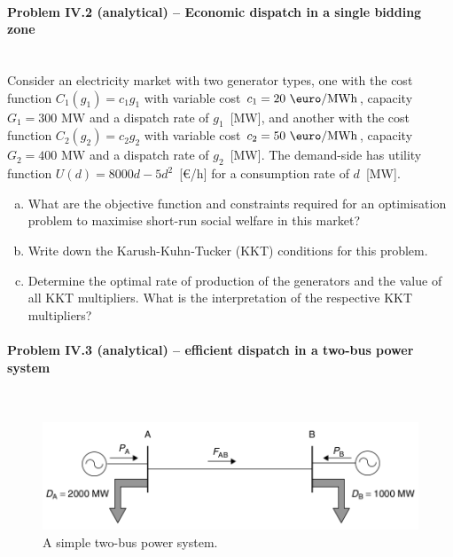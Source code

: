 \documentclass[11pt,a4paper,fleqn]{scrartcl}
\def\mw{\text{ MW}}
\def\emwh{\text{ \euro/MWh}}
\begin{document}
\paragraph{Problem IV.2 (analytical) -- Economic dispatch in a single bidding zone \faGroup}~\\

Consider an electricity market with two generator types, one with the cost function $C_1(g_1)=c_1g_1$ with variable cost $c_1 = 20\emwh$, capacity $G_1 = 300\mw$ and a dispatch rate of $g_1$~[MW], and another with the cost function $C_2(g_2)=c_2g_2$ with variable cost $c_2=50\emwh$, capacity $G_2=400\mw$ and a dispatch rate of $g_2$~[MW]. The demand-side has utility function $U(d) = 8000d - 5d^2$~[\euro/h] for a consumption rate of $d$~[MW].
\begin{enumerate}[(a)]
 \item What are the objective function and constraints required for an optimisation problem to maximise short-run social welfare in this market?
 \item Write down the Karush-Kuhn-Tucker (KKT) conditions for this problem.
 \item Determine the optimal rate of production of the generators and the value of all KKT multipliers. What is the interpretation of the respective KKT multipliers?
\end{enumerate}

\newpage
\paragraph{Problem IV.3 (analytical) -- efficient dispatch in a two-bus power system \faHome}~\\

\begin{figure}[h]
 \centering
 \includegraphics[width=14cm]{two-bus}

 \caption{A simple two-bus power system.}
 \label{twobus}
\end{figure}
\end{document}
